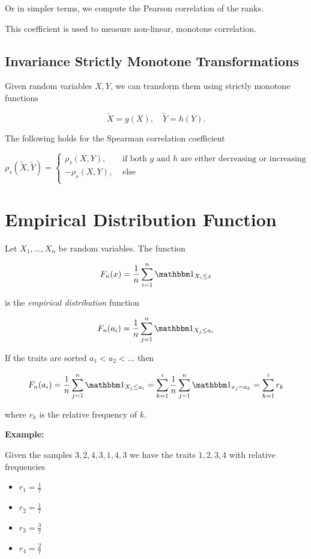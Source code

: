 Or in simpler terms, we compute the Pearson correlation of the ranks.

This coefficient is used to measure non-linear, monotone correlation.

\subsection{Invariance Strictly Monotone Transformations}

Given random variables \(X,Y\), we can transform them using strictly monotone functions 

\[
    \tilde{X} = g(X), \quad \tilde{Y} = h(Y).
\]

The following holds for the Spearman correlation coefficient

\[
    \rho_s (\tilde{X}, \tilde{Y}) = 
    \begin{cases}
        \rho_s (X,Y), & \text{ if both \(g\) and \(h\) are either decreasing or increasing} \\ 
        -\rho_s (X,Y), & \text{ else} \\ 
    \end{cases}
\]

\section{Empirical Distribution Function}

Let \(X_1, \ldots, X_n\) be random variables. The function 

\[
    F_n (x) = \frac{1}{n} \sum_{i = 1}^{n} \ind_{X_i \le x}
\]

is the \emph{empirical distribution} function 

\[
    F_n (a_i) = \frac{1}{n} \sum_{j = 1}^{n} \ind_{X_j \le a_i}
\]

If the traits are sorted \(a_1 < a_2 < \dots\) then 

\[
    F_n (a_i) = \frac{1}{n} \sum_{j = 1}^{n} \ind_{X_j \le a_i} = \sum_{k = 1}^{i} \frac{1}{n} \sum_{j = 1}^{n} \ind_{x_j = a_k} = \sum_{k = 1}^{i} r_k
\]

where \(r_k\) is the relative frequency of \(k\).

\textbf{Example:}

Given the samples \(3, 2, 4, 3, 1, 4, 3\) we have the traits \(1, 2, 3, 4\) with relative frequencies 

\begin{itemize}

    \item \(r_1 = \frac{1}{7}\)

    \item \(r_2 = \frac{1}{7}\)

    \item \(r_3 = \frac{3}{7}\)

    \item \(r_4 = \frac{2}{7}\)

\end{itemize}

